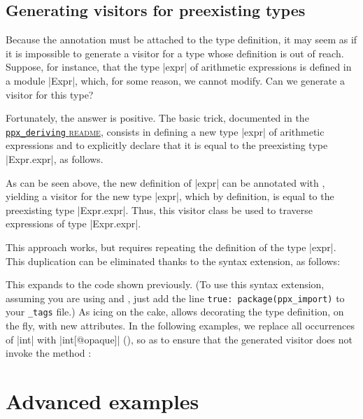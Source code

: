 \documentclass[11pt,a4paper,twoside]{article}
\begin{document}
\subsection{Generating visitors for preexisting types}
\label{sec:import}

Because the \derivingvisitors annotation must be attached to the type
definition, it may seem as if it is impossible to generate a visitor for a
type whose definition is out of reach. Suppose, for instance, that the type
\oc|expr| of arithmetic expressions is defined in a module \oc|Expr|, which,
for some reason, we cannot modify. Can we generate a visitor for this type?

Fortunately, the answer is positive. The basic trick, documented in the
\href{https://github.com/whitequark/ppx_deriving/#working-with-existing-types}
{\texttt{ppx\_deriving} \textsc{readme}},
consists in defining a new type \oc|expr| of arithmetic expressions and to
explicitly declare that it is equal to the preexisting type \oc|Expr.expr|,
as follows.


As can be seen above, the new definition of \oc|expr| can be annotated with
\derivingvisitors, yielding a visitor for the new type \oc|expr|, which by
definition, is equal to the preexisting type \oc|Expr.expr|. Thus, this
visitor class be used to traverse expressions of type \oc|Expr.expr|.

This approach works, but requires repeating the definition of the type \oc|expr|.
This duplication can be eliminated thanks to the \ppximport syntax extension,
as follows:


This expands to the code shown previously. (To use this syntax extension,
assuming you are using \ocamlbuild and \ocamlfind, just add the line
\texttt{true: package(ppx\_import)} to your \texttt{\_tags} file.) As icing on
the cake, \ppximport allows decorating the type definition, on the fly, with
new attributes. In the following examples, we replace all occurrences of
\oc|int| with \oc|int[@opaque]| (), so as to ensure that the
generated visitor does not invoke the method :



\section{Advanced examples}
\label{sec:advanced}
\end{document}
